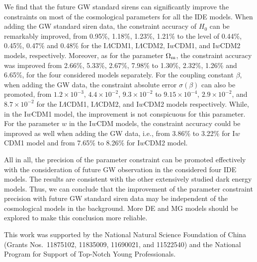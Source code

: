 \documentclass[aps,prd,nofootinbib,amsmath,amssymb,superscriptaddress,twocolumn,10pt]{revtex4}%
\newcommand{\red}{\textcolor[rgb]{1.00,0.00,0.00}}
\begin{document}
We find that the future GW standard sirens can significantly improve the constraints on most of the cosmological parameters for all the IDE models. When adding the GW standard siren data, the constraint accuracy of $H_0$ can be remarkably improved, from 0.95\%, 1.18\%, 1.23\%, 1.21\% to the level of 0.44\%, 0.45\%, 0.47\% and 0.48\% for the I$\Lambda$CDM1, I$\Lambda$CDM2, I$w$CDM1, and I$w$CDM2 models, respectively. Moreover, as for the parameter $\Omega_{\rm m}$, the constraint accuracy was improved from 2.66\%, 5.33\%, 2.67\%, 7.98\% to 1.30\%, 2.32\%, 1.26\% and 6.65\%, for the four considered models separately. \red{For the coupling constant $\beta$, when adding the GW data, the constraint absolute error $\sigma(\beta)$ can also be promoted, from $1.2 \times 10^{-3}$, $4.4 \times 10^{-2}$, $9.3 \times 10^{-2}$ to $9.15 \times 10^{-4}$, $2.9 \times 10^{-2}$, and $8.7 \times 10^{-2}$ for the I$\Lambda$CDM1, I$\Lambda$CDM2, and I$w$CDM2 models respectively. While, in the I$w$CDM1 model, the improvement is not conspicuous for this parameter.} For the parameter $w$ in the I$w$CDM models, the constraint accuracy could be improved as well when adding the GW data, i.e., from 3.86\% to 3.22\% for I$w$CDM1 model and from 7.65\% to 8.26\% for I$w$CDM2 model.

All in all, the precision of the parameter constraint can be promoted effectively with the consideration of future GW observation in the considered four IDE models. The results are consistent with the other extensively studied dark energy models. Thus, we can conclude that the improvement of the parameter constraint precision with future GW standard siren data may be independent of the cosmological models in the background. More DE and MG models should be explored to make this conclusion more reliable.
\begin{acknowledgments}
This work was supported by the National Natural Science Foundation of China (Grants Nos.~11875102, 11835009, 11690021, and 11522540) and the National Program for Support of Top-Notch Young Professionals.

\end{acknowledgments}
\end{document}
